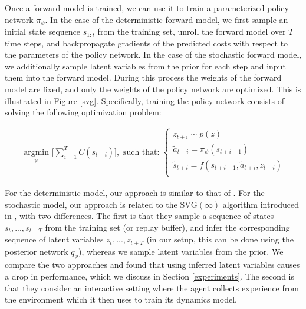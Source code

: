\documentclass{article} %
\begin{document}
Once a forward model is trained, we can use it to train a parameterized policy network $\pi_\psi$.
In the case of the deterministic forward model, we first sample an initial state sequence $s_{1:t}$ from the training set, unroll the forward model over $T$ time steps, and backpropagate gradients of the predicted costs with respect to the parameters of the policy network.
In the case of the stochastic forward model, we additionally sample latent variables from the prior for each step and input them into the forward model.
During this process the weights of the forward model are fixed, and only the weights of the policy network are optimized. This is illustrated in Figure \ref{svg}.
Specifically, training the policy network consists of solving the following optimization problem:


    \begin{align*}
    \underset{\psi}{\mbox{ argmin }} \Big[ \sum_{i=1}^{T} C(s_{t+i}) \Big],  \mbox{ such that: }
    \begin{cases}
      z_{t+i} \sim p(z) \\
      \tilde{a}_{t+i} = \pi_\psi(s_{t+i-1}) \\
      \tilde{s}_{t+i} = f(\tilde{s}_{t+i-1}, \tilde{a}_{t+i}, z_{t+i}) \\
      \end{cases}
    \end{align*}

    For the deterministic model, our approach is similar to that of \citep{Nguyen1989}.
    For the stochastic model, our approach is related to the $\mbox{SVG}(\infty)$ algorithm introduced in \citep{SVG}, with two differences. The first is that they sample a sequence of states $s_t, ..., s_{t+T}$ from the training set (or replay buffer), and infer the corresponding sequence of latent variables $z_t, ..., z_{t+T}$ (in our setup, this can be done using the posterior network $q_\phi$), whereas we sample latent variables from the prior. We compare the two approaches and found that using inferred latent variables causes a drop in performance, which we discuss in Section \ref{experiments}.
    The second is that they consider an interactive setting where the agent collects experience from the environment which it then uses to train its dynamics model.
\end{document}
